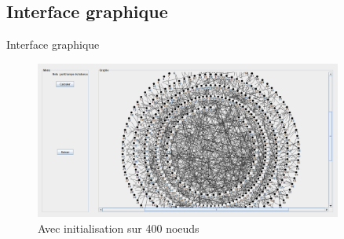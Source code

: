 \documentclass[aspectratio=169,xcolor=dvipsnames]{beamer}
\begin{document}
\subsection{Interface graphique}
    \begin{frame}{Interface graphique}
        \begin{figure}
        \centering
            \includegraphics[width=0.9\textwidth]{interface.png}
            \caption{Avec initialisation sur 400 noeuds}
            \label{fig:interface}
        \end{figure}	
    \end{frame}
\end{document}
